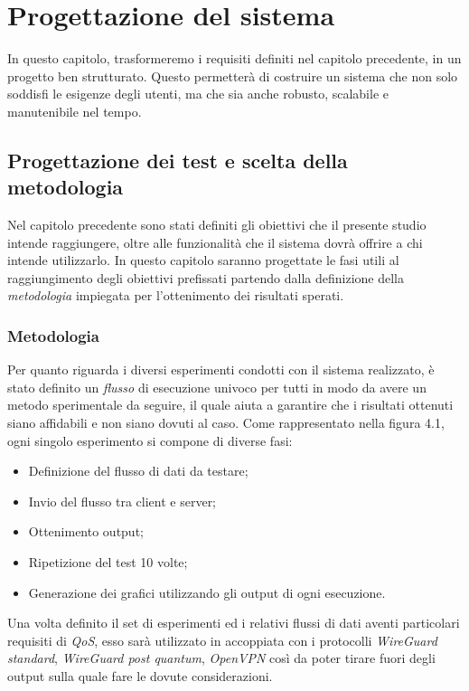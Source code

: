 \chapter{Progettazione del sistema} %
%

\begin{citazione}
In questo capitolo, trasformeremo i requisiti definiti nel capitolo precedente, in un progetto ben strutturato. Questo permetterà di costruire un sistema che non solo soddisfi le esigenze degli utenti, ma che sia anche robusto, scalabile e manutenibile nel tempo.
\end{citazione}
\newpage
\section{Progettazione dei test e scelta della metodologia}
Nel capitolo precedente sono stati definiti gli obiettivi che il presente studio intende raggiungere, oltre alle funzionalità che il sistema dovrà offrire a chi intende utilizzarlo. In questo capitolo saranno progettate le fasi utili al raggiungimento degli obiettivi prefissati partendo dalla definizione della \emph{metodologia} impiegata per l'ottenimento dei risultati sperati.
\subsection{Metodologia}
Per quanto riguarda i diversi esperimenti condotti con il sistema realizzato, è stato definito un \emph{flusso} di esecuzione univoco per tutti in modo da avere un metodo sperimentale da seguire, il quale aiuta a garantire che i risultati ottenuti siano affidabili e non siano dovuti al caso. Come rappresentato nella figura 4.1, ogni singolo esperimento si compone di diverse fasi:
\begin{itemize}
    \item Definizione del flusso di dati da testare;
    \item Invio del flusso tra client e server;
    \item Ottenimento output;
    \item Ripetizione del test 10 volte;
    \item Generazione dei grafici utilizzando gli output di ogni esecuzione.
\end{itemize}
Una volta definito il set di esperimenti ed i relativi flussi di dati aventi particolari requisiti di \emph{QoS}, esso sarà utilizzato in accoppiata con i protocolli \emph{WireGuard standard}, \emph{WireGuard post quantum}, \emph{OpenVPN} così da poter tirare fuori degli output sulla quale fare le dovute considerazioni.

